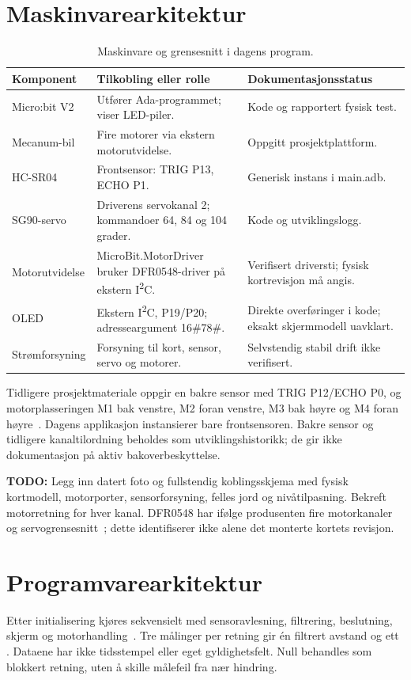 \documentclass[a4paper,11pt,oneside]{report}
\newcommand{\todo}[1]{\textcolor{todocolor}{\textbf{TODO:} #1}}
\newcommand{\kode}[1]{\begingroup
 \sbox0{\texttt{\detokenize{#1}}}%
 \ifdim\wd0>150pt\relax
  {\urlstyle{tt}\expandafter\nolinkurl\expandafter{\detokenize{#1}}}%
 \else\usebox0\fi\endgroup}
\begin{document}
\section{Maskinvarearkitektur}
\begin{table}[htbp]
\small
\begin{tabularx}{\textwidth}{@{}P{31mm}YP{43mm}@{}}
\toprule Komponent & Tilkobling eller rolle & Dokumentasjonsstatus\\\midrule
Micro:bit V2 & Utfører Ada-programmet; viser LED-piler. & Kode og rapportert fysisk test.\\
Mecanum-bil & Fire motorer via ekstern motorutvidelse. & Oppgitt prosjektplattform.\\
HC-SR04 & Frontsensor: TRIG P13, ECHO P1. & Generisk instans i main.adb.\\
SG90-servo & Driverens servokanal 2; kommandoer 64, 84 og 104 grader. & Kode og utviklingslogg.\\
Motorutvidelse & MicroBit.MotorDriver bruker DFR0548-driver på ekstern I\textsuperscript{2}C. & Verifisert driversti; fysisk kortrevisjon må angis.\\
OLED & Ekstern I\textsuperscript{2}C, P19/P20; adresseargument 16\#78\#. & Direkte overføringer i kode; eksakt skjermmodell uavklart.\\
Strømforsyning & Forsyning til kort, sensor, servo og motorer. & Selvstendig stabil drift ikke verifisert.\\
\bottomrule
\end{tabularx}
\caption{Maskinvare og grensesnitt i dagens program.}
\label{tab:hardware}
\end{table}

Tidligere prosjektmateriale oppgir en bakre sensor med TRIG P12/ECHO P0,
og motorplasseringen M1 bak venstre, M2 foran venstre, M3 bak høyre og M4 foran
høyre~\cite{tidligere}. Dagens applikasjon instansierer bare frontsensoren.
Bakre sensor og tidligere kanaltilordning beholdes som utviklingshistorikk;
de gir ikke dokumentasjon på aktiv bakoverbeskyttelse.

\todo{Legg inn datert foto og fullstendig koblingsskjema med fysisk kortmodell,
motorporter, sensorforsyning, felles jord og nivåtilpasning. Bekreft motorretning
for hver kanal.} DFR0548 har ifølge produsenten fire motorkanaler og
servogrensesnitt~\cite{dfr0548}; dette identifiserer ikke alene det monterte kortets revisjon.

\section{Programvarearkitektur}
Etter initialisering kjøres \kode{case Current_State} sekvensielt med
sensoravlesning, filtrering, beslutning, skjerm og motorhandling~\cite{kode}.
Tre målinger per retning gir én filtrert avstand og ett
\kode{Best_Direction}. Dataene har ikke tidsstempel eller eget gyldighetsfelt.
Null behandles som blokkert retning, uten å skille målefeil fra nær hindring.
\end{document}
